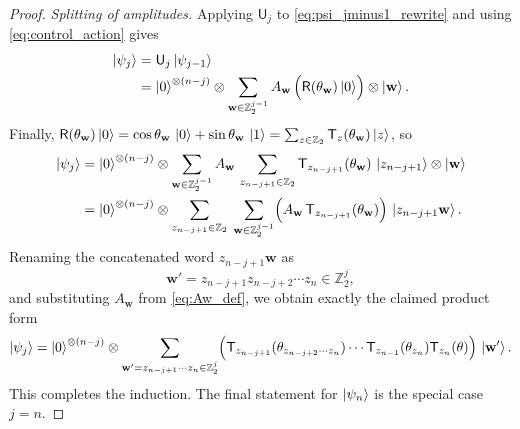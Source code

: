 \documentclass[10pt,a4paper]{amsart}
\newcommand{\rR}{\mathsf{R}}
\newcommand{\rU}{\mathsf{U}}
\begin{document}
\begin{proof}
\smallskip
\noindent\emph{Splitting of amplitudes.}
Applying $\rU_j$ to \eqref{eq:psi_jminus1_rewrite} and using \eqref{eq:control_action} gives
\begin{align*}
\ket{\psi_j}
&=\rU_j\ket{\psi_{j-1}}\\
&=
\ket{0}^{\otimes(n-j)}\otimes
\sum_{\mathbf{w}\in\mathbb{Z}_2^{j-1}} A_{\mathbf{w}}\,
\Bigl(\rR(\theta_{\mathbf{w}})\ket{0}\Bigr)\otimes\ket{\mathbf{w}}.
\end{align*}
Finally, $\rR(\theta_{\mathbf{w}})\ket{0}=\cos\theta_{\mathbf{w}}\,\ket{0}+\sin\theta_{\mathbf{w}}\,\ket{1}
=\sum_{z\in\mathbb{Z}_2}\mathsf{T}_{z}(\theta_{\mathbf{w}})\ket{z}$, so
\begin{align*}
\ket{\psi_j}
&=
\ket{0}^{\otimes(n-j)}\otimes
\sum_{\mathbf{w}\in\mathbb{Z}_2^{j-1}} A_{\mathbf{w}}\,
\sum_{z_{n-j+1}\in\mathbb{Z}_2}\mathsf{T}_{z_{n-j+1}}(\theta_{\mathbf{w}})\,
\ket{z_{n-j+1}}\otimes\ket{\mathbf{w}}\\
&=
\ket{0}^{\otimes(n-j)}\otimes
\sum_{z_{n-j+1}\in\mathbb{Z}_2}\;
\sum_{\mathbf{w}\in\mathbb{Z}_2^{j-1}}
\Bigl(A_{\mathbf{w}}\,\mathsf{T}_{z_{n-j+1}}(\theta_{\mathbf{w}})\Bigr)\,
\ket{z_{n-j+1}\mathbf{w}}.
\end{align*}
Renaming the concatenated word $z_{n-j+1}\mathbf{w}$ as
\[
\mathbf{w}'=z_{n-j+1}z_{n-j+2}\cdots z_n\in\mathbb{Z}_2^j,
\]
and substituting $A_{\mathbf{w}}$ from \eqref{eq:Aw_def}, we obtain exactly the claimed product form
\[
\ket{\psi_j}
=
\ket{0}^{\otimes (n-j)}\otimes
\sum_{\mathbf{w}'=z_{n-j+1}\cdots z_n\in\mathbb{Z}_2^{j}}
\Bigl(\mathsf{T}_{z_{n-j+1}}(\theta_{z_{n-j+2}\cdots z_n})\cdots
\mathsf{T}_{z_{n-1}}(\theta_{z_n})\mathsf{T}_{z_n}(\theta)\Bigr)\,
\ket{\mathbf{w}'}.
\]
This completes the induction. The final statement for $\ket{\psi_n}$ is the special case $j=n$.
\end{proof}
\end{document}
